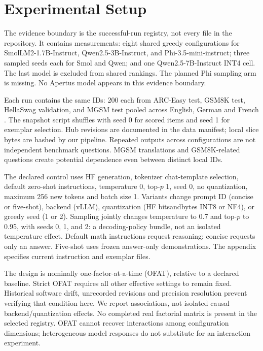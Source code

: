 \section{Experimental Setup}
\label{sec:setup}
The evidence boundary is the successful-run registry, not every file in the repository. It contains \RunCount{} measurements: eight shared greedy configurations for SmolLM2-1.7B-Instruct, Qwen2.5-3B-Instruct, and Phi-3.5-mini-instruct; three sampled seeds each for Smol and Qwen; and one Qwen2.5-7B-Instruct INT4 cell. The last model is excluded from shared rankings. The planned Phi sampling arm is missing. No Apertus model appears in this evidence boundary.

Each run contains the same \ItemCount{} IDs: 200 each from ARC-Easy test, GSM8K test, HellaSwag validation, and MGSM test pooled across English, German and French \citep{clark2018think,cobbe2021training,zellers2019hellaswag,shi2022language}. The snapshot script shuffles with seed 0 for scored items and seed 1 for exemplar selection. Hub revisions are documented in the data manifest; local slice bytes are hashed by our pipeline. Repeated outputs across configurations are not independent benchmark questions. MGSM translations and GSM8K-related questions create potential dependence even between distinct local IDs.

The declared control uses HF generation, tokenizer chat-template selection, default zero-shot instructions, temperature 0, top-$p$ 1, seed 0, no quantization, maximum 256 new tokens and batch size 1. Variants change prompt ID (concise or five-shot), backend (vLLM), quantization (HF bitsandbytes INT8 or NF4), or greedy seed (1 or 2). Sampling jointly changes temperature to 0.7 and top-$p$ to 0.95, with seeds 0, 1, and 2: a decoding-policy bundle, not an isolated temperature effect. Default math instructions request reasoning; concise requests only an answer. Five-shot uses frozen answer-only demonstrations. The appendix specifies current instruction and exemplar files.

The design is nominally one-factor-at-a-time (OFAT), relative to a declared baseline. Strict OFAT requires all other effective settings to remain fixed. Historical software drift, unrecorded revisions and precision resolution prevent verifying that condition here. We report associations, not isolated causal backend/quantization effects. No completed real factorial matrix is present in the selected registry. OFAT cannot recover interactions among configuration dimensions; heterogeneous model responses do not substitute for an interaction experiment.

